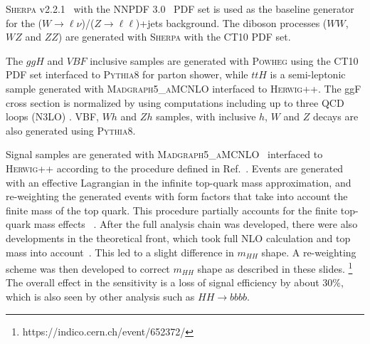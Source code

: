 \textsc{Sherpa} v2.2.1~\cite{Gleisberg:2008ta} with the
\textsc{NNPDF 3.0}~\cite{Lai:2010vv} PDF set is used as the baseline
generator for the ($W \to \ell\nu$)/($Z\to \ell\ell$)+jets background.
The diboson processes ($WW$,
$WZ$ and $ZZ$) are generated with \textsc{Sherpa} with the \textsc{CT10} PDF
set.  

The $ggH$ and $VBF$ inclusive samples are generated with \textsc{Powheg} using
the \textsc{CT10} PDF set interfaced to \textsc{Pythia8} for parton
shower, while $ttH$ is a semi-leptonic sample generated with
\textsc{Madgraph5\_aMC\at{}NLO} interfaced to \textsc{Herwig++}. The ggF cross
section is normalized by using computations including up to three QCD
loops (N3LO) \cite{Anastasiou:2016cez}. VBF, $Wh$ and $Zh$ samples,
  with inclusive $h$, $W$ and $Z$ decays
are also generated using \textsc{Pythia8}. 


Signal samples are
generated with \textsc{Madgraph5\_aMC\at{}NLO}~\cite{Alwall:2014hca} interfaced to
\textsc{Herwig++} according to the procedure defined in Ref.~\cite{CP3Paper}. 
Events are generated with an effective
Lagrangian in the infinite top-quark mass approximation, and  re-weighting the
generated events  with form factors that take into
account the finite mass of the top quark.  This procedure partially
accounts for the finite top-quark mass effects ~\cite{Degrassi_Ramona}. After the full analysis chain was developed, there were also developments in the theoretical front, which took full NLO calculation and top mass into account~\cite{Borowka:2016ypz, Borowka:2016ehy}. This led to a slight difference in $m_{HH}$ shape. A re-weighting scheme was then developed to correct $m_{HH}$ shape as described in these slides. {\footnote {https://indico.cern.ch/event/652372/}} The overall effect in the sensitivity is a loss of signal efficiency by about 30\%, which is also seen by other analysis such as $HH \rightarrow bbbb$. 

 
